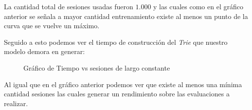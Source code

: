 	
\begin{table}[]
	\centering \label{freq:exp3}
		\caption{Frecuencia de símbolos para experimentos con sesiones de largo constante.}	
	
\end{table}	
	
	
	La cantidad total de sesiones usadas fueron $1.000$ y las cuales como en el gráfico anterior se señala a mayor cantidad entrenamiento existe al menos un punto de la curva que se vuelve un máximo.


	Seguido a esto podemos ver el tiempo de construcción del \emph{Trie} que nuestro modelo demora en generar:
	
	
	
	\begin{figure}[h] 
		\centering
		\caption{Gráfico de Tiempo vs sesiones de largo constante}
		\label{fig:sim}
	\end{figure}
	
	

	Al igual que en el gráfico anterior podemos ver que existe al menos una mínima cantidad sesiones las cuales generar un rendimiento sobre las evaluaciones a realizar. 
